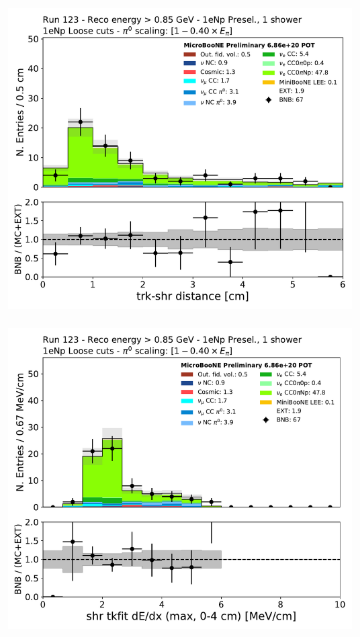 \begin{figure}[H]
    \begin{center}
    \begin{subfigure}{0.32\textwidth}
    \includegraphics[width=1.00\textwidth]{Sidebands/Figures/1eNp/HighEnergy/HiEext_NPOneShr_NPL_pi0e040/tksh_distance_zoomed.pdf}
    \end{subfigure}
    \begin{subfigure}{0.32\textwidth}
    \includegraphics[width=1.00\textwidth]{Sidebands/Figures/1eNp/HighEnergy/HiEext_NPOneShr_NPL_pi0e040/shr_tkfit_dedx_max.pdf}

\end{subfigure}
\end{center}
\end{figure}
